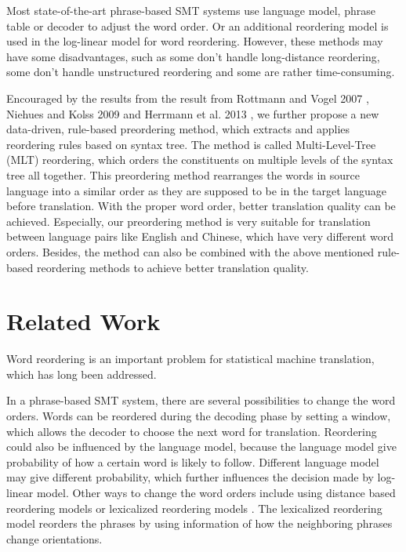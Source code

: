 \documentclass[a4paper]{article}
\begin{document}
Most state-of-the-art phrase-based SMT systems use language model, phrase table or decoder to adjust the word order. Or an additional reordering model is used in the log-linear model for word reordering. However, these methods may have some disadvantages, such as some don't handle long-distance reordering, some don't handle unstructured reordering and some are rather time-consuming.

Encouraged by the results from the result from Rottmann and Vogel 2007 \cite{short}, Niehues and Kolss 2009 \cite{long} and Herr\-mann et al. 2013 \cite{tree}, we further propose a new data-driven, rule-based preordering method, which extracts and applies reordering rules based on syntax tree. The method is called Multi-Level-Tree (MLT) reordering, which orders the constituents on multiple levels of the syntax tree all together. This preordering method rearranges the words in source language into a similar order as they are supposed to be in the target language before translation. With the proper word order, better translation quality can be achieved. Especially, our preordering method is very suitable for translation between language pairs like English and Chinese, which have very different word orders. Besides, the method can also be combined with the above mentioned rule-based reordering methods to achieve better translation quality. 

\section{Related Work}

Word reordering is an important problem for statistical machine translation, which has long been addressed.

In a phrase-based SMT system, there are several possibilities to change the word orders. Words can be reordered during the decoding phase by setting a window, which allows the decoder to choose the next word for translation. Reordering could also be influenced by the language model, because the language model give probability of how a certain word is likely to follow. Different language model may give different probability, which further influences the decision made by log-linear model. Other ways to change the word orders include using distance based reordering models or lexicalized reordering models \cite{tillmann2004, koehn2005}. The lexicalized reordering model reorders the phrases by using information of how the neighboring phrases change orientations.
\end{document}
